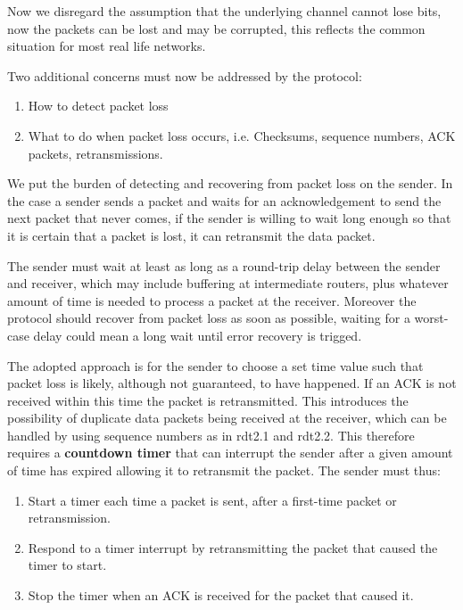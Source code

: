 \documentclass[12pt letter]{report}
\begin{document}
Now we disregard the assumption that the underlying channel cannot
lose bits, now the packets can be lost and may be corrupted, this
reflects the common situation for most real life networks.

Two additional concerns must now be addressed by the protocol:
\begin{enumerate}
  \item How to detect packet loss
  \item What to do when packet loss occurs, i.e. Checksums, sequence
    numbers, ACK packets, retransmissions.
\end{enumerate}

We put the burden of detecting and recovering from packet loss on the
sender. In the case a sender sends a packet and waits for an
acknowledgement to send the next packet that never comes, if the
sender is willing to wait long enough so that it is certain that a
packet is lost, it can retransmit the data packet.

The sender must wait at least as long as a round-trip delay between
the sender and receiver, which may include buffering at intermediate
routers, plus whatever amount of time is needed to process a packet
at the receiver. Moreover the protocol should recover from packet
loss as soon as possible, waiting for a worst-case delay could mean a
long wait until error recovery is trigged.

The adopted approach is for the sender to choose a set time value
such that packet loss is likely, although not guaranteed, to have
happened. If an ACK is not received within this time the packet is
retransmitted. This introduces the possibility of duplicate data
packets being received at the receiver, which can be handled by using
sequence numbers as in rdt2.1 and rdt2.2. This therefore requires a
\textbf{countdown timer} that can interrupt the sender after a given
amount of time has expired allowing it to retransmit the packet. The
sender must thus:
\begin{enumerate}
  \item Start a timer each time a packet is sent, after a first-time
    packet or retransmission.
  \item Respond to a timer interrupt by retransmitting the packet
    that caused the timer to start.
  \item Stop the timer when an ACK is received for the packet that caused it.
\end{enumerate}
\end{document}
